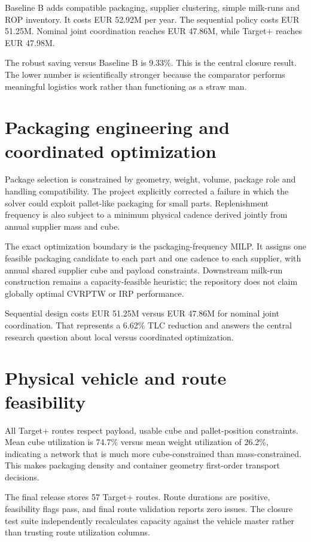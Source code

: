 \documentclass[11pt]{article}
\begin{document}
Baseline B adds compatible packaging, supplier clustering, simple milk-runs and ROP inventory. It costs EUR 52.92M per year. The sequential policy costs EUR 51.25M. Nominal joint coordination reaches EUR 47.86M, while Target+ reaches EUR 47.98M.

The robust saving versus Baseline B is 9.33\%. This is the central closure result. The lower number is scientifically stronger because the comparator performs meaningful logistics work rather than functioning as a straw man.

\section{Packaging engineering and coordinated optimization}
Package selection is constrained by geometry, weight, volume, package role and handling compatibility. The project explicitly corrected a failure in which the solver could exploit pallet-like packaging for small parts. Replenishment frequency is also subject to a minimum physical cadence derived jointly from annual supplier mass and cube.

The exact optimization boundary is the packaging-frequency MILP. It assigns one feasible packaging candidate to each part and one cadence to each supplier, with annual shared supplier cube and payload constraints. Downstream milk-run construction remains a capacity-feasible heuristic; the repository does not claim globally optimal CVRPTW or IRP performance.

Sequential design costs EUR 51.25M versus EUR 47.86M for nominal joint coordination. That represents a 6.62\% TLC reduction and answers the central research question about local versus coordinated optimization.

\section{Physical vehicle and route feasibility}
All Target+ routes respect payload, usable cube and pallet-position constraints. Mean cube utilization is 74.7\% versus mean weight utilization of 26.2\%, indicating a network that is much more cube-constrained than mass-constrained. This makes packaging density and container geometry first-order transport decisions.

The final release stores 57 Target+ routes. Route durations are positive, feasibility flags pass, and final route validation reports zero issues. The closure test suite independently recalculates capacity against the vehicle master rather than trusting route utilization columns.
\end{document}
